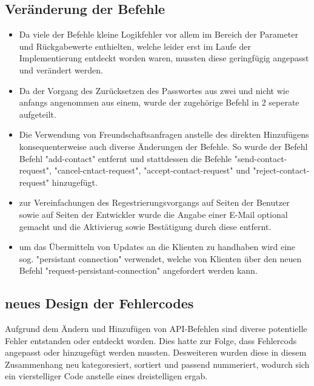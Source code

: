 \documentclass[parskip=full,11pt]{scrartcl}
\begin{document}
\subsection{Veränderung der Befehle}
	\begin{itemize}
	\item Da viele der Befehle kleine Logikfehler vor allem
	im Bereich der Parameter und Rückgabewerte enthielten,
	welche leider erst im Laufe der Implementierung entdeckt worden waren,
	mussten diese geringfügig angepasst und verändert werden.
	\item Da der Vorgang des Zurücksetzen des Passwortes aus zwei
	und nicht wie anfangs angenommen aus einem,
	wurde der zugehörige Befehl in 2 seperate aufgeteilt.
	\item Die Verwendung von Freundschaftsanfragen anstelle des direkten
	Hinzufügens konsequenterweise auch diverse Änderungen der Befehle.
	So wurde der Befehl Befehl "add-contact" entfernt und stattdessen die Befehle
	"send-contact-request", "cancel-cntact-request", "accept-contact-request" und
	"reject-contact-request" hinzugefügt.
	\item zur Vereinfachungen des Regestrierungsvorgangs auf Seiten der Benutzer
	sowie auf Seiten der Entwickler wurde die Angabe einer E-Mail optional gemacht
	und die Aktivierug sowie Bestätigung durch diese entfernt.
	\item um das Übermitteln von Updates an die Klienten zu handhaben wird eine
	sog. "persistant connection" verwendet, welche von Klienten über den neuen
	Befehl "request-persistant-connection" angefordert werden kann.
	\end{itemize}

\subsection{neues Design der Fehlercodes}
	Aufgrund dem Ändern und Hinzufügen von API-Befehlen
	sind diverse potentielle Fehler entstanden oder entdeckt worden.
	Dies hatte zur Folge, dass Fehlercods angepasst
	oder hinzugefügt werden mussten.
	Desweiteren wurden diese in diesem Zusammenhang neu kategoresiert,
	sortiert und passend nummeriert, wodurch sich ein vierstelliger Code
	anstelle eines dreistelligen ergab.
\end{document}
